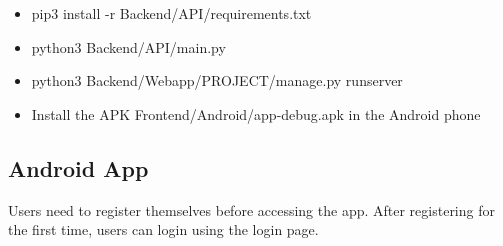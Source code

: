 \documentclass{article}
\begin{document}
\begin{itemize}
    \item{pip3 install -r Backend/API/requirements.txt}
    
    \item{python3 Backend/API/main.py}
    
    \item{python3 Backend/Webapp/PROJECT/manage.py runserver}
    
    \item{Install the APK Frontend/Android/app-debug.apk in the Android phone}
\end{itemize}

\newpage
\subsection{Android App}
Users need to register themselves before accessing the app. After registering for the first time, users can login using the login page.
\end{document}
